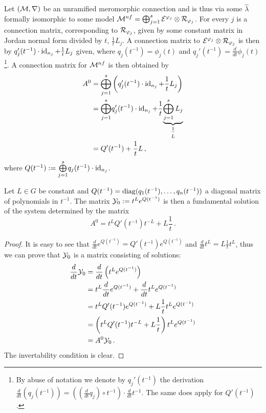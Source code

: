 Let $(\mathcal{M},\nabla)$ be an unramified meromorphic connection and is thus via some
$\hat\lambda$ formally isomorphic to some model
$\mathcal{M}^{nf}=\bigoplus_{j=1}^s\mathcal{E}^{\varphi_j}\otimes\mathcal{R}_{\varphi_j}$.
For every $j$ is a connection matrix, corresponding to $\mathcal{R}_{\varphi_j}$, given
by some constant matrix in Jordan normal form divided by $t$, $\frac{1}{t}L_j$.
A connection matrix to $\mathcal{E}^{\varphi_j}\otimes\mathcal{R}_{\varphi_j}$ is then by
$q_j'(t^{-1})\cdot\operatorname{id}_{n_j}+\frac{1}{t}L_j$ given\TODO[(cf.~???)], where
$q_j(t^{-1})=\phi_j(t)$ and $q_j'(t^{-1})=\frac{d}{dt}\phi_j(t)$\footnote{By
abuse of notation we denote by $q_j'(t^{-1})$ the derivation
$\frac{d}{dt}(q_j(t^{-1}))=\left(\left(\frac{d}{dt}q_j\right)\circ t^{-1}\right)
\cdot\frac{d}{dt}t^{-1}$. The same does apply for $Q'(t^{-1})$.}.
A connection matrix for $\mathcal{M}^{nf}$ is then obtained by
\begin{align*}
  A^0&= \bigoplus_{j=1}^s
  \left(q_j'(t^{-1})\cdot\id_{n_j}+\frac{1}{t}L_j\right)
  \\&= 
    \underset{j=1}{\overset{s}{\bigoplus}}q_j'(t^{-1})\cdot\id_{n_j}
    +\frac{1}{t}\underset{L}{%
    \underset{\text{\rotatebox[origin=c]{-90}{$=:$}}}{\underbrace{%
    \bigoplus_{j=1}^sL_j}}}
  \\&=Q'(t^{-1})+\frac{1}{t}L \,,
\end{align*}
where
$Q(t^{-1}):=\underset{j=1}{\overset{s}{\bigoplus}}q_j(t^{-1})\cdot\operatorname{id}_{n_j}$.
\begin{prop}\label{prop:fundSolBuilder}
  Let $L\in G$ be constant and $Q(t^{-1})=\operatorname{diag}(q_1(t^{-1}),\dots,q_n(t^{-1}))$
  a diagonal matrix of polynomials in $t^{-1}$.
  The matrix $\mathcal{Y}_0:=t^L e^{Q(t^{-1})}$ is then a fundamental solution of the
  system determined by the matrix
  \[
    A^0=t^LQ'(t^{-1})t^{-L}+L\frac{1}{t} \,.
  \]
\end{prop}
\begin{proof}
  It is easy to see that $\frac{d}{dt}e^{Q(t^{-1})}=Q'(t^{-1})e^{Q(t^{-1})}$
  and $\frac{d}{dt}t^L=L\frac{1}{t}t^L$, thus we can prove
  that $\mathcal{Y}_0$ is a matrix consisting of solutions:
  \begin{align*}
    \frac{d}{dt}\mathcal{Y}_0
    &=\frac{d}{dt}\left(t^Le^{Q(t^{-1})}\right)
  \\&= t^L\frac{d}{dt}e^{Q(t^{-1})} + \frac{d}{dt}t^Le^{Q(t^{-1})}
  \\&= t^LQ'(t^{-1})e^{Q(t^{-1})} + L\frac{1}{t}t^Le^{Q(t^{-1})}
  \\&=\left(t^LQ'(t^{-1})t^{-L}+L\frac{1}{t}\right)t^Le^{Q(t^{-1})}
  \\&=A^0\mathcal{Y}_0 \,.
  \end{align*}
  The invertability condition is clear.
\end{proof}
